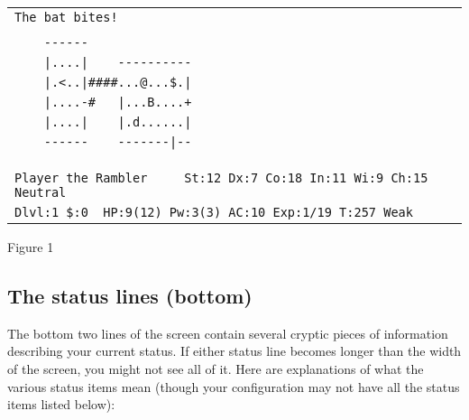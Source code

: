 \begin{center}
\begin{tabular}{l}
\verb~The bat bites!                                                   ~\\
                                                                        \\
\verb~    ------                                                       ~\\
\verb~    |....|    ----------                                         ~\\
\verb~    |.<..|####...@...$.|                                         ~\\
\verb~    |....-#   |...B....+                                         ~\\
\verb~    |....|    |.d......|                                         ~\\
\verb~    ------    -------|--                                         ~\\
                                                                        \\
                                                                        \\
                                                                        \\
\verb~Player the Rambler     St:12 Dx:7 Co:18 In:11 Wi:9 Ch:15  Neutral~\\
\verb~Dlvl:1 $:0  HP:9(12) Pw:3(3) AC:10 Exp:1/19 T:257 Weak           ~\\
                                                                        
\end{tabular}
\end{center}
\begin{center}
Figure 1
\end{center}

\subsection*{The status lines (bottom)}


The bottom two lines of the screen contain several cryptic pieces of
information describing your current status.  If either status line
becomes longer than the width of the screen, you might not see all of
it.  Here are explanations of what the various status items mean
(though your configuration may not have all the status items listed
below):
\blist{}

